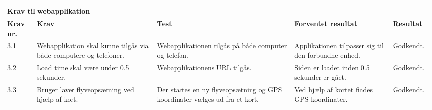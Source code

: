\vspace{2.5cm}

    
    \begin{tabular}{|p{}|p{3.2 cm}|p{3.2 cm}|p{3.2 cm}|p{2.2 cm}|}
			\hline
			\multicolumn{5}{|l|}{\textbf{{\large Krav til webapplikation}}}\\ \hline
			\textbf{Krav nr.} & \textbf{Krav} & \textbf{Test} & \textbf{Forventet \newline resultat} & 			
			\textbf{Resultat} \\ \hline
			
			3.1 & Webapplikation skal kunne tilgås via både computere og telefoner.
				& Webapplikationen tilgås på både computer og telefon.
				& Applikationen tilpasser sig til den forbundne enhed.
				& Godkendt. \\ \hline

			3.2 & Load time skal være under 0.5 sekunder. 
				& Webapplikationens URL tilgås.
				& Siden er loadet inden 0.5 sekunder er gået.
				& Godkendt. \\ \hline
			
			3.3 & Bruger laver \newline flyveopsætning ved hjælp af kort.
				& Der startes en ny flyveopsætning og GPS koordinater vælges ud fra et kort.
				& Ved hjælp af kortet findes GPS koordinater.
				& Godkendt. \\ \hline				
		\end{tabular}
	\label{tab:krav_1}


\vspace{1cm}
    
